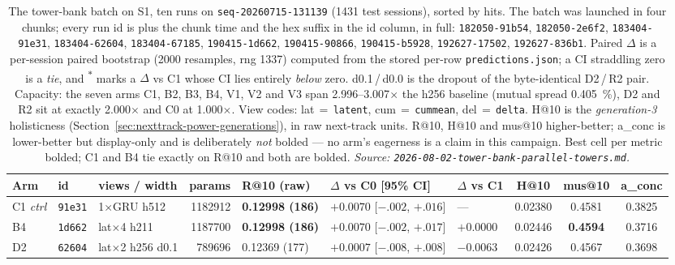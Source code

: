 \documentclass[11pt]{article}
\newcommand{\runid}[1]{\texttt{\small\seqsplit{#1}}}
\newcommand{\dsid}[1]{\texttt{\small #1}}
\newcommand{\best}[1]{\textbf{#1}}
\begin{document}
\begin{table}[ht]
  \centering
  \caption{The tower-bank batch on S1, ten runs on \dsid{seq-20260715-131139}
  (\num{1431} test sessions), sorted by hits. The batch was launched in four
  chunks; every run id is \protect\runid{run-20260802-} plus the chunk time and
  the hex suffix in the id column, in full: \texttt{182050-91b54},
  \texttt{182050-2e6f2}, \texttt{183404-91e31}, \texttt{183404-62604},
  \texttt{183404-67185}, \texttt{190415-1d662}, \texttt{190415-90866},
  \texttt{190415-b5928}, \texttt{192627-17502}, \texttt{192627-836b1}. Paired
  $\Delta$ is a per-session paired bootstrap (\num{2000} resamples, rng
  \num{1337}) computed from the stored per-row \texttt{predictions.json}; a CI
  straddling zero is a \emph{tie}, and \textsuperscript{$\ast$} marks a $\Delta$
  vs C1 whose CI lies entirely \emph{below} zero. d\num{0.1}\,/\,d\num{0.0} is
  the dropout of the byte-identical D2\,/\,R2 pair. Capacity: the seven arms C1,
  B2, B3, B4, V1, V2 and V3 span \numrange{2.996}{3.007}$\times$ the h256
  baseline (mutual spread \SI{0.405}{\percent}), D2 and R2 sit at exactly
  \num{2.000}$\times$ and C0 at \num{1.000}$\times$. View codes:
  lat\,$=$\,\texttt{latent}, cum\,$=$\,\texttt{cummean},
  del\,$=$\,\texttt{delta}. H@10 is the \emph{generation-3} holisticness
  (Section~\ref{sec:nexttrack-power-generations}), in raw next-track units. R@10,
  H@10 and mus@10 higher-better; a\_conc is lower-better but display-only and is
  deliberately \emph{not} bolded --- no arm's eagerness is a claim in this
  campaign. Best cell per metric bolded; C1 and B4 tie exactly on R@10 and both
  are bolded.
  \emph{Source: \texttt{2026-08-02-tower-bank-parallel-towers.md}.}}
  \label{tab:nexttrack-towerbank-s1}
  {\scriptsize\setlength{\tabcolsep}{1.9pt}\begin{tabular}{lllrlllccc}
    \toprule
    Arm & id & views / width & params & R@10 (raw) & $\Delta$ vs C0 [95\% CI] & $\Delta$ vs C1 & H@10 & mus@10 & a\_conc \\
    \midrule
    C1 \emph{ctrl} & \texttt{91e31} & 1$\times$GRU h512 & \num{1182912} & \best{0.12998 (186)} & $+0.0070$ [$-.002$, $+.016$] & --- & 0.02380 & 0.4581 & 0.3825 \\
    B4 & \texttt{1d662} & lat$\times$4 h211 & \num{1187700} & \best{0.12998 (186)} & $+0.0070$ [$-.002$, $+.017$] & $+0.0000$ & 0.02446 & \best{0.4594} & 0.3716 \\
    D2 & \texttt{62604} & lat$\times$2 h256 d\num{0.1} & \num{789696} & 0.12369 (177) & $+0.0007$ [$-.008$, $+.008$] & $-0.0063$ & 0.02426 & 0.4567 & 0.3698 \\

\end{tabular}}
\end{table}
\end{document}
